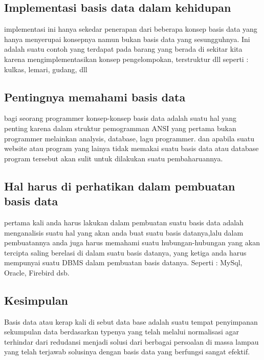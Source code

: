 \documentclass[a4paper,12 pt]{article}
\begin{document}
\subsection{Implementasi basis data dalam kehidupan}
	implementasi ini hanya sekedar penerapan dari beberapa konsep basis data yang hanya menyerupai konsepnya namun bukan basis data yang sesungguhnya. Ini adalah suatu contoh yang terdapat pada barang yang berada di sekitar kita karena mengimplementasikan konsep pengelompokan, terstruktur dll seperti : kulkas, lemari, gudang, dll
\subsection{Pentingnya memahami basis data}
bagi seorang programmer konsep-konsep basis data adalah suatu hal yang penting karena dalam struktur pemogramman ANSI yang pertama bukan programmer melainkan analysis, database, lagu programmer. dan apabila suatu website atau program yang lainya tidak memakai suatu basis data atau database program tersebut akan sulit untuk dilakukan suatu pembaharuannya. 
\newpage
\subsection{Hal harus di perhatikan dalam pembuatan basis data}
pertama kali anda harus lakukan dalam pembuatan suatu basis data adalah menganalisis suatu hal yang akan anda buat suatu basis datanya,lalu dalam pembuatannya anda juga harus memahami suatu hubungan-hubungan yang akan tercipta saling berelasi di dalam suatu basis datanya, yang ketiga anda harus mempunyai suatu DBMS dalam pembuatan basis datanya. Seperti : MySql, Oracle, Firebird dsb.
\subsection{Kesimpulan}
Basis data atau kerap kali di sebut data base adalah suatu tempat penyimpanan sekumpulan data berdasarkan typenya yang telah melalui normalisasi agar terhindar dari redudansi menjadi solusi dari berbagai persoalan di massa lampau yang telah terjawab solusinya dengan basis data yang berfungsi sangat efektif.
\end{document}
